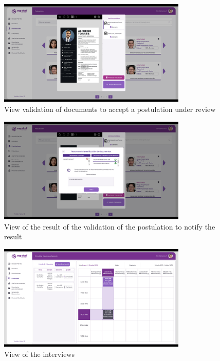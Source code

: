 \documentclass{scrreprt}
\begin{document}
\begin{figure}[H]
	\centering \small
	\includegraphics[width=0.8\textwidth]{WebPrototype/wflow-27.jpeg}
	\caption{View validation of documents to accept a postulation under review}
\end{figure}

\begin{figure}[H]
	\centering \small
	\includegraphics[width=0.8\textwidth]{WebPrototype/wflow-28.jpeg}
	\caption{View of the result of the validation of the postulation to notify the result}
\end{figure}

\begin{figure}[H]
	\centering \small
	\includegraphics[width=0.8\textwidth]{WebPrototype/wflow-29.jpeg}
	\caption{View of the interviews}
\end{figure}
\end{document}
